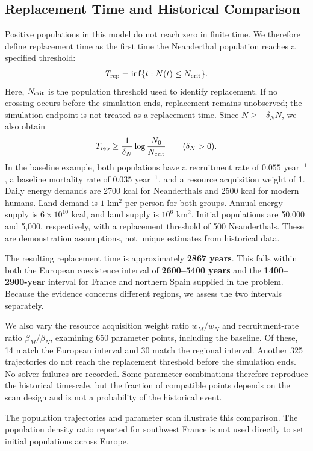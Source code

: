 \documentclass[12pt,a4paper]{article}
\theoremstyle{remark}
\begin{document}
\subsection{Replacement Time and Historical Comparison}
Positive populations in this model do not reach zero in finite time. We therefore define replacement time as the first time the Neanderthal population reaches a specified threshold:
\[
T_{\rm rep}=\inf\{t:N(t)\le N_{\rm crit}\}.
\]
Here, $N_{\rm crit}$ is the population threshold used to identify replacement. If no crossing occurs before the simulation ends, replacement remains unobserved; the simulation endpoint is not treated as a replacement time. Since $\dot N\ge-\delta_NN$, we also obtain
\begin{equation}
T_{\rm rep}\ge\frac{1}{\delta_N}\log\frac{N_0}{N_{\rm crit}}\qquad(\delta_N>0).
\end{equation}
In the baseline example, both populations have a recruitment rate of $0.055$ year$^{-1}$, a baseline mortality rate of $0.035$ year$^{-1}$, and a resource acquisition weight of 1. Daily energy demands are 2700 kcal for Neanderthals and 2500 kcal for modern humans. Land demand is $1$ km$^2$ per person for both groups. Annual energy supply is $6\times10^{10}$ kcal, and land supply is $10^6$ km$^2$. Initial populations are 50,000 and 5,000, respectively, with a replacement threshold of 500 Neanderthals. These are demonstration assumptions, not unique estimates from historical data.

The resulting replacement time is approximately \textbf{2867 years}. This falls within both the European coexistence interval of \textbf{2600--5400 years} and the \textbf{1400--2900-year} interval for France and northern Spain supplied in the problem. Because the evidence concerns different regions, we assess the two intervals separately.

We also vary the resource acquisition weight ratio $w_M/w_N$ and recruitment-rate ratio $\beta_M/\beta_N$, examining 650 parameter points, including the baseline. Of these, 14 match the European interval and 30 match the regional interval. Another 325 trajectories do not reach the replacement threshold before the simulation ends. No solver failures are recorded. Some parameter combinations therefore reproduce the historical timescale, but the fraction of compatible points depends on the scan design and is not a probability of the historical event.

The population trajectories and parameter scan illustrate this comparison. The population density ratio reported for southwest France is not used directly to set initial populations across Europe.
\end{document}
